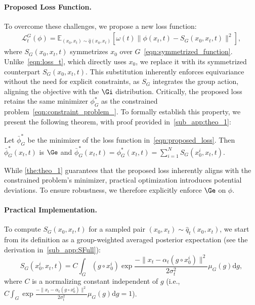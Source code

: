 \paragraph{Proposed Loss Function.} To overcome these challenges, we propose a new loss function:
\begin{align} 
\mathcal{L}^G_t(\phi) = \mathbb{E}_{(x_0, x_t) \sim \hat{q}(x_0, x_t)} \left[ \omega(t) \| \phi(x_t, t) - S_G(x_0, x_t, t) \|^2 \right], 
\label{eqn:proposed_loss} 
\end{align}
where \( S_G(x_0, x_t, t) \) symmetrizes \(x_0\) over \(G\)~\eqref{eqn:symmetrized_function}. Unlike~\eqref{eqn:loss_t}, which directly uses \(x_0\), we replace it with its symmetrized counterpart \(S_G(x_0, x_t, t)\). This substitution inherently enforces equivariance without the need for explicit constraints, as \(S_G\) integrates the group action, aligning the objective with the \(\Gi\) distribution. Critically, the proposed loss retains the same minimizer \( \phi^*_G \) as the constrained problem~\eqref{eqn:constraint_problem_}. To formally establish this property, we present the following theorem, with proof provided in~\cref{sub_app:theo_1}:
\begin{tcolorbox}[title=Equivariant Minimizer of \(\mcL_t^G (\phi)\)]
\begin{theorem}
Let \( \bar{\phi}^*_G \) be the minimizer of the loss function in~\eqref{eqn:proposed_loss}. Then \( \bar{\phi}^*_G(x_t, t) \) is \( \Ge \) and 
\( \bar{\phi}^*_G(x_t, t) = \phi^*_G (x_t, t) = \sum_{i=1}^N S_G(x_0^i, x_t, t). \)
\label{the:theo_1}
\end{theorem}
\end{tcolorbox}
While \cref{the:theo_1} guarantees that the proposed loss inherently aligns with the constrained problem's minimizer, practical optimization introduces potential deviations. To ensure robustness, we therefore explicitly enforce \(\Ge\) on \(\phi\). 


\paragraph{Practical Implementation.}  
To compute \( S_G(x_0, x_t, t) \) for a sampled pair \((x_0, x_t) \sim \hat{q}_t(x_0, x_t)\), we start from its definition as a group-weighted averaged posterior expectation (see the derivation in~\cref{sub_app:SFull}):
\begin{equation}
    S_G(x_0^i, x_t, t) = C \int_G (g \circ x_0^i) \exp{\frac{-\| x_t - \alpha_t (g \circ x_0^i) \|^2}{2\sigma_t^2}} \mu_G(g) \mathrm{d}g,
    \label{eqn:final_form}
\end{equation}
where \( C \) is a normalizing constant independent of \( g \) (i.e., \( C \int_G \exp{\frac{-\| x_t - \alpha_t (g \circ x_0^i) \|^2}{2\sigma_t^2}} \mu_G(g) \mathrm{d}g = 1 \)).  

